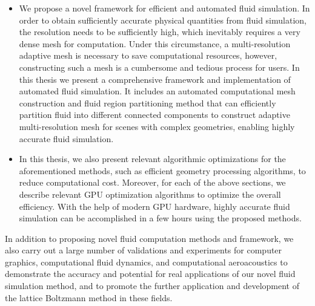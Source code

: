 \begin{abstract*}[flattitle]
\begin{itemize}
    \item We propose a novel framework for efficient and automated fluid simulation. In order to obtain sufficiently accurate physical quantities from fluid simulation, the resolution needs to be sufficiently high, which inevitably requires a very dense mesh for computation. Under this circumstance, a multi-resolution adaptive mesh is necessary to save computational resources, however, constructing such a mesh is a cumbersome and tedious process for users. In this thesis we present a comprehensive framework and implementation of automated fluid simulation. It includes an automated computational mesh construction and fluid region partitioning method that can efficiently partition fluid into different connected components to construct adaptive multi-resolution mesh for scenes with complex geometries, enabling highly accurate fluid simulation.
    \item In this thesis, we also present relevant algorithmic optimizations for the aforementioned methods, such as efficient geometry processing algorithms, to reduce computational cost. Moreover, for each of the above sections, we describe relevant GPU optimization algorithms to optimize the overall efficiency. With the help of modern GPU hardware, highly accurate fluid simulation can be accomplished in a few hours using the proposed methods.
  \end{itemize}

  In addition to proposing novel fluid computation methods and framework, we also carry out a large number of validations and experiments for computer graphics, computational fluid dynamics, and computational aeroacoustics to demonstrate the accuracy and potential for real applications of our novel fluid simulation method, and to promote the further application and development of the lattice Boltzmann method in these fields.
\end{abstract*}